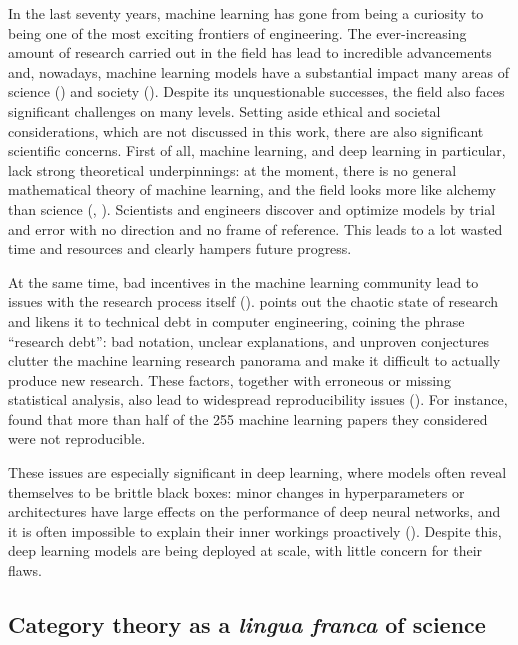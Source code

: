 \documentclass[11pt,a4paper,openright,twoside]{report}
\theoremstyle{plain}
\theoremstyle{definition}
\newcommand\dblquote[1]{\textquotedblleft #1\textquotedblright}
\begin{document}
In the last seventy years, machine learning has gone from being a curiosity to being one of the most exciting frontiers of engineering. The ever-increasing amount of research carried out in the field has lead to incredible advancements and, nowadays, machine learning models have a substantial impact many areas of science (\cite{hajkowicz2023artificial}) and society (\cite{khogali2023blended}). Despite its unquestionable successes, the field also faces significant challenges on many levels. Setting aside ethical and societal considerations, which are not discussed in this work, there are also significant scientific concerns. First of all, machine learning, and deep learning in particular, lack strong theoretical underpinnings: at the moment, there is no general mathematical theory of machine learning, and the field looks more like alchemy than science (\cite{gavranovic2024fundamental}, \cite{rahimi2017machine}). Scientists and engineers discover and optimize models by trial and error with no direction and no frame of reference. This leads to a lot wasted time and resources and clearly hampers future progress.


At the same time, bad incentives in the machine learning community lead to issues with the research process itself (\cite{shiebler2021category}). \cite{olah2017research} points out the chaotic state of research and likens it to technical debt in computer engineering, coining the phrase \dblquote{research debt}: bad notation, unclear explanations, and unproven conjectures clutter the machine learning research panorama and make it difficult to actually produce new research. These factors, together with erroneous or missing statistical analysis, also lead to widespread reproducibility issues (\cite{gundersen2022sources}). For instance, \cite{raff2019step} found that more than half of the 255 machine learning papers they considered were not reproducible. 


These issues are especially significant in deep learning, where models often reveal themselves to be brittle black boxes: minor changes in hyperparameters or architectures have large effects on the performance of deep neural networks, and it is often impossible to explain their inner workings proactively (\cite{gavranovic2024fundamental}).
Despite this, deep learning models are being deployed at scale, with little concern for their flaws.  


\subsection*{Category theory as a \textit{lingua franca} of science}
\end{document}
